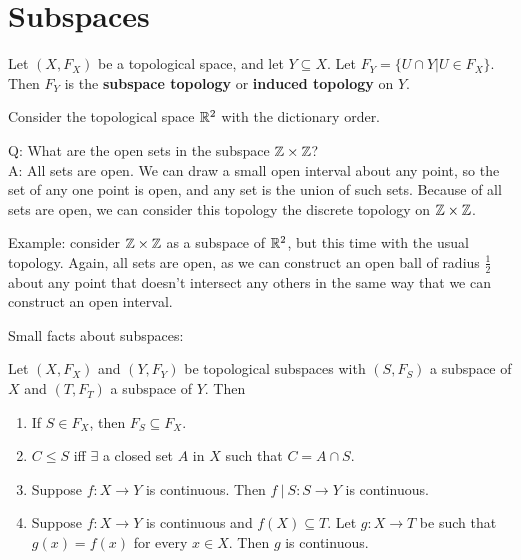 

\section{Subspaces}
\begin{definition}
	Let $(X, F_X)$ be a topological space, and let $Y\subseteq X$. Let $F_Y = \{U \cap Y | U\in F_X\}$. Then $F_Y$ is the {\bf subspace topology} or {\bf induced topology} on $Y$. 
\end{definition}
\begin{example}
	Consider the topological space $\mathbb R^2$ with the dictionary order. 
\end{example}

Q: What are the open sets in the subspace $\mathbb Z \times \mathbb Z$?\\
A: All sets are open. We can draw a small open interval about any point, so the set of any one point is open, and any set is the union of such sets. Because of all sets are open, we can consider this topology the discrete topology on $\mathbb Z \times \mathbb Z$.

Example: consider $\mathbb Z \times \mathbb Z$ as a subspace of $\mathbb R^2$, but this time with the usual topology. Again, all sets are open, as we can construct an open ball of radius $\frac12$ about any point that doesn't intersect any others in the same way that we can construct an open interval.

Small facts about subspaces:

Let $(X, F_X)$ and $(Y, F_Y)$ be topological subspaces with $(S, F_S)$ a subspace of $X$ and $(T, F_T)$ a subspace of $Y$. Then 
\begin{enumerate}
	\item If $S\in F_X$, then $F_S \subseteq F_X$. 
	\item $C\le S$ iff $\exists$ a closed set $A$ in $X$ such that $C = A\cap S$. 
	\item Suppose $f:X\to Y$ is continuous. Then $f\ |\ S : S \to Y$ is continuous. 
	\item Suppose $f:X\to Y$ is continuous and $f(X) \subseteq T$. Let $g:X\to T$ be such that $g(x) = f(x) $ for every $x\in X$. Then $g$ is continuous. 
\end{enumerate}

